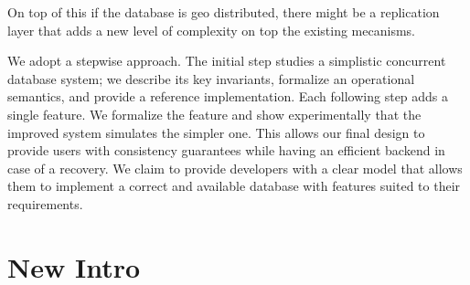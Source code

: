 \documentclass[systeme]{compas2022}
\begin{document}
On top of this if the database is geo distributed, there might be a replication layer that adds a new level of complexity on top the existing mecanisms.


We adopt a stepwise approach.
The initial step studies a simplistic concurrent database system; we describe its key invariants, formalize an operational semantics, and provide a reference implementation.
Each following step adds a single feature.
We formalize the feature and show experimentally that the improved system simulates the simpler one.
This allows our final design to provide users with consistency guarantees while having an efficient backend in case of a recovery.
We claim to provide developers with a clear model that allows them to implement a correct and available database with features suited to their requirements.





\section{New Intro}
\end{document}
